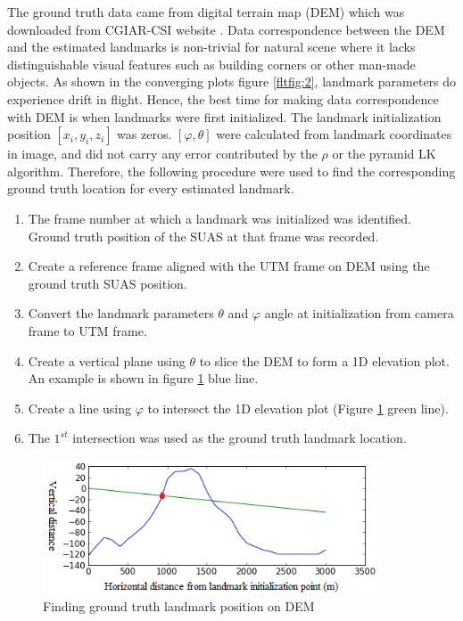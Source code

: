 The ground truth data came from digital terrain map (DEM) which was
downloaded from CGIAR-CSI website \cite{_cgiar-csi_????}. Data
correspondence between the DEM and the estimated landmarks is
non-trivial for natural scene where it lacks distinguishable visual
features such as building corners or other man-made objects. As shown
in the converging plots figure \ref{fltfig:2}, landmark parameters do
experience drift in flight. Hence, the best time
for making data correspondence with DEM is when landmarks were first
initialized. The landmark initialization position $[x_i, y_i, z_i]$
was zeros. $[\varphi, \theta]$ were
calculated from landmark coordinates in image, and did not carry any
error contributed by the $\rho$ or the pyramid LK algorithm.
Therefore, the following procedure were used to find the
corresponding ground truth location for every estimated landmark.

\begin{enumerate}
  \item The frame number at which a landmark was initialized was
  identified. Ground truth position of the SUAS at that frame was
  recorded.
  \item Create a reference frame aligned with the UTM frame on DEM
  using the ground truth SUAS position.
  \item Convert the landmark parameters $\theta$ and $\varphi$
  angle at initialization from camera frame to UTM frame. 
  \item Create a vertical plane using $\theta$ to slice the DEM to
  form a 1D elevation plot. An example is shown in figure
  \ref{fltfig:7} blue line.
  \item Create a line using $\varphi$ to intersect the 1D elevation plot
  (Figure \ref{fltfig:7} green line). 
  \item The $1^{st}$ intersection was used as the ground truth landmark
  location.
\end{enumerate}

\begin{figure}[h]
\centering
\includegraphics[width=10cm, keepaspectratio=true]
{./Figures/fltfig/find_groundtruth.png}
\caption{Finding ground truth landmark position on DEM}
\label{fltfig:7}
\end{figure}


